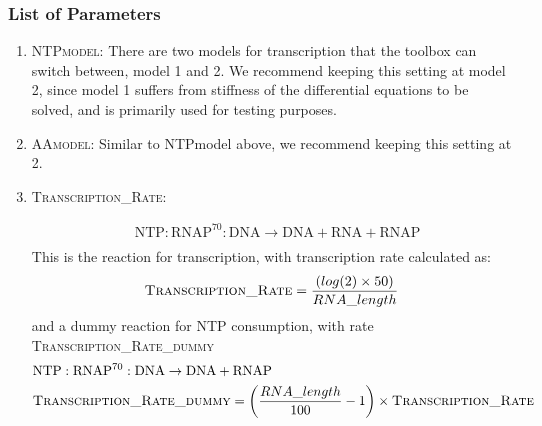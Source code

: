 		\subsubsection*{List of Parameters}
			\begin{enumerate}
			\item \textsc{NTPmodel}: 
			There are two models for transcription that the toolbox can switch between, model 1 and 2. We recommend keeping this setting at model 2, since model 1 suffers from stiffness of the differential equations to be solved, and is primarily used for testing purposes. 
        	\item \textsc{AAmodel}: 
        	Similar to NTPmodel above, we recommend keeping this setting at 2. 
        	\item \textsc{Transcription\_Rate}:
        	
        	\begin{align}
        	& \mathrm{NTP:RNAP^{70}:DNA} \rightarrow \mathrm{DNA} + \mathrm{RNA} + \mathrm{RNAP} \\
        	\end{align}
        	This is the reaction for transcription, with transcription rate calculated as:\\
        	\begin{align}
        	& \textsc{Transcription\_Rate} = \frac{(log(2)\times50)}{RNA\_length}\\
        	\end{align}
        	\textrm{and a dummy reaction for NTP consumption, with rate \textsc{Transcription\_Rate\_dummy}} \\
        	\begin{align}
        	& \mathrm{NTP:RNAP^{70}:DNA} \rightarrow \mathrm{DNA} + \mathrm{RNAP} \\ 
        	& \textsc{Transcription\_Rate\_dummy} = \left(\frac{RNA\_length}{100}-1\right)\times\textsc{Transcription\_Rate}
        	\end{align}
        	

\end{enumerate}
